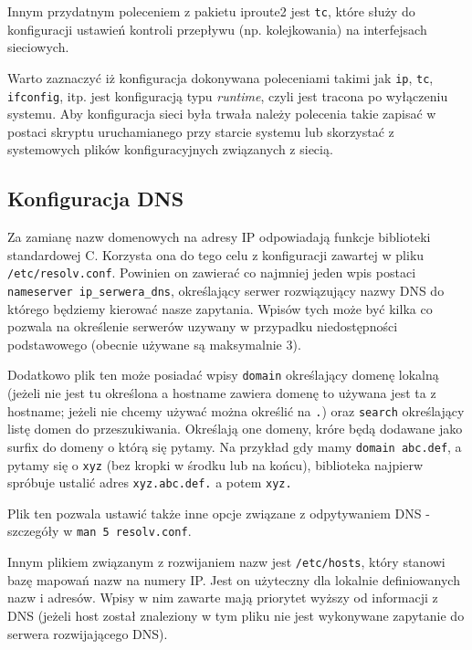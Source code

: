 Innym przydatnym poleceniem z pakietu iproute2 jest \Verb#tc#, które służy do konfiguracji ustawień kontroli przepływu (np. kolejkowania) na interfejsach sieciowych.

Warto zaznaczyć iż konfiguracja dokonywana poleceniami takimi jak \Verb#ip#, \Verb#tc#, \Verb#ifconfig#, itp. jest konfiguracją typu \textit{runtime}, czyli jest tracona po wyłączeniu systemu.
Aby konfiguracja sieci była trwała należy polecenia takie zapisać w postaci skryptu uruchamianego przy starcie systemu lub skorzystać z systemowych plików konfiguracyjnych związanych z siecią.


\subsection{Konfiguracja DNS}

Za zamianę nazw domenowych na adresy IP odpowiadają funkcje biblioteki standardowej C. Korzysta ona do tego celu z konfiguracji zawartej w pliku \Verb#/etc/resolv.conf#.
Powinien on zawierać co najmniej jeden wpis postaci \Verb#nameserver ip_serwera_dns#, określający serwer rozwiązujący nazwy DNS do którego będziemy kierować nasze zapytania.
Wpisów tych może być kilka co pozwala na określenie serwerów uzywany w przypadku niedostępności podstawowego (obecnie używane są maksymalnie 3).

Dodatkowo plik ten może posiadać wpisy
	\Verb#domain# określający domenę lokalną (jeżeli nie jest tu określona a hostname zawiera domenę to używana jest ta z hostname; jeżeli nie chcemy używać można określić na \Verb#.#) oraz
	\Verb#search# określający listę domen do przeszukiwania.
Określają one domeny, króre będą dodawane jako surfix do domeny o którą się pytamy. Na przykład gdy mamy \Verb#domain abc.def#, a pytamy się o \Verb#xyz# (bez kropki w środku lub na końcu), biblioteka najpierw spróbuje ustalić adres \Verb#xyz.abc.def.# a potem \Verb#xyz.#

Plik ten pozwala ustawić także inne opcje związane z odpytywaniem DNS - szczegóły w \Verb#man 5 resolv.conf#.

Innym plikiem związanym z rozwijaniem nazw jest \Verb#/etc/hosts#, który stanowi bazę mapowań nazw na numery IP.
Jest on użyteczny dla lokalnie definiowanych nazw i adresów.
Wpisy w nim zawarte mają priorytet wyższy od informacji z DNS (jeżeli host został znaleziony w tym pliku nie jest wykonywane zapytanie do serwera rozwijającego DNS).


